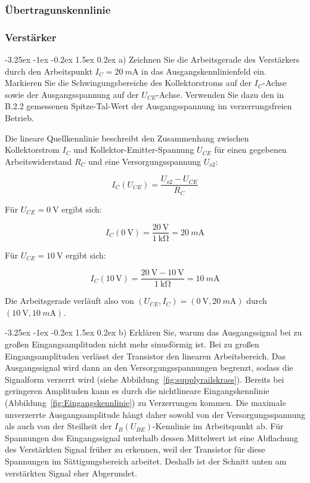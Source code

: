 \documentclass[
	a4paper, %
	12pt, %
]{CSUniSchoolLabReport}
\makeatletter
\renewcommand\paragraph{\@startsection{paragraph}{4}{\z@}%
  {-3.25ex \@plus -1ex \@minus -0.2ex}%
  {1.5ex \@plus 0.2ex}%
  {\normalfont\normalsize\bfseries}}
\newcommand{\milli}{m}
\makeatother
\begin{document}
\subsubsection{Übertragunskennlinie}
\subsubsection{Verstärker}


\paragraph{a) Zeichnen Sie die Arbeitsgerade des Verstärkers durch den Arbeitspunkt $I_C = \SI{20}{\milli\ampere}$ in das Ausgangskennlinienfeld ein. Markieren Sie die Schwingungsbereiche des Kollektorstroms auf der $I_C$-Achse sowie der Ausgangsspannung auf der $U_{CE}$-Achse. Verwenden Sie dazu den in B.2.2 gemessenen Spitze-Tal-Wert der Ausgangsspannung im verzerrungsfreien Betrieb.}

Die lineare Quellkennlinie beschreibt den Zusammenhang zwischen Kollektorstrom $I_C$ und Kollektor-Emitter-Spannung $U_{CE}$ für einen gegebenen Arbeitswiderstand $R_C$ und eine Versorgungsspannung $U_{o2}$:

\[
I_C(U_{CE}) = \frac{U_{o2} - U_{CE}}{R_C}
\]

Für $U_{CE} = \SI{0}{\volt}$ ergibt sich:

\[
I_C(\SI{0}{\volt}) = \frac{\SI{20}{\volt}}{\SI{1}{\kilo\ohm}} = \SI{20}{\milli\ampere}
\]

Für $U_{CE} = \SI{10}{\volt}$ ergibt sich:

\[
I_C(10\,\mathrm{V}) = \frac{\SI{20}{\volt}- \SI{10}{\volt}}{\SI{1}{\kilo\ohm}} = \SI{10}{\milli\ampere}
\]

Die Arbeitsgerade verläuft also von $(U_{CE}, I_C) = (\SI{0}{\volt}, \SI{20}{\milli\ampere})$ durch $(\SI{10}{\volt}, \SI{10}{\milli\ampere})$.

\paragraph{b) Erklären Sie, warum das Ausgangssignal bei zu großen Eingangsamplituden nicht mehr sinusförmig ist.}
Bei zu großen Eingangsamplituden verlässt der Transistor den linearen Arbeitsbereich. Das Ausgangssignal wird dann an den Versorgungsspannungen begrenzt, sodass die Signalform verzerrt wird (siehe Abbildung~\ref{fig:supplyrailskrass}). Bereits bei geringeren Amplituden kann es durch die nichtlineare Eingangskennlinie (Abbildung~\ref{fig:Eingangskennlinie}) zu Verzerrungen kommen. Die maximale unverzerrte Ausgangsamplitude hängt daher sowohl von der Versorgungsspannung als auch von der Steilheit der $I_B(U_{BE})$-Kennlinie im Arbeitspunkt ab.  
Für Spannungen des Eingangssignal unterhalb dessen Mittelwert ist eine Abflachung des Verstärkten Signal früher zu erkennen, weil der Transistor für diese Spannungen im Sättigungsbereich arbeitet. Deshalb ist der Schnitt unten am verstärkten Signal eher Abgerundet. 
\end{document}
